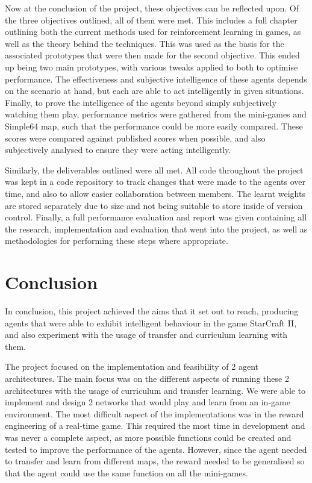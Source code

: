 Now at the conclusion of the project, these objectives can be reflected upon. Of
the three objectives outlined, all of them were met. This includes a full
chapter outlining both the current methods used for reinforcement learning in
games, as well as the theory behind the techniques. This was used as the basis
for the associated prototypes that were then made for the second objective. This
ended up being two main prototypes, with various tweaks applied to both to
optimise performance. The effectiveness and subjective intelligence of these
agents depends on the scenario at hand, but each are able to act intelligently
in given situations. Finally, to prove the intelligence of the agents beyond
simply subjectively watching them play, performance metrics were gathered from
the mini-games and Simple64 map, such that the performance could be more easily
compared. These scores were compared against published scores when possible, and
also subjectively analysed to ensure they were acting intelligently.

Similarly, the deliverables outlined were all met. All code throughout the
project was kept in a code repository to track changes that were made to the
agents over time, and also to allow easier collaboration between members. The
learnt weights are stored separately due to size and not being suitable to store
inside of version control. Finally, a full performance evaluation and report was
given containing all the research, implementation and evaluation that went into
the project, as well as methodologies for performing these steps where
appropriate.


\section{Conclusion}

In conclusion, this project achieved the aims that it set out to reach,
producing agents that were able to exhibit intelligent behaviour in the game
StarCraft II, and also experiment with the usage of transfer and curriculum
learning with them.

The project focused on the implementation and feasibility of 2 agent
architectures. The main focus was on the different aspects of running these 2
architectures with the usage of curriculum and transfer learning. We were able
to implement and design 2 networks that would play and learn from an in-game
environment. The most difficult aspect of the implementations was in the reward
engineering of a real-time game. This required the most time in development and
was never a complete aspect, as more possible functions could be created and
tested to improve the performance of the agents. However, since the agent needed
to transfer and learn from different maps, the reward needed to be generalised
so that the agent could use the same function on all the mini-games.

